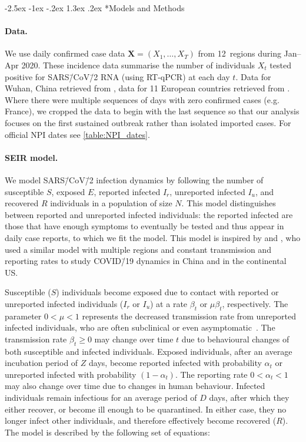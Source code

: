 \documentclass[12pt]{extarticle}
\makeatletter
\renewcommand\section{\@startsection {section}{1}{\z@}%
     {-2.5ex \@plus -1ex \@minus -.2ex}%
     {1.3ex \@plus.2ex}%
    {\Large\bfseries}}
\newcommand{\covid}{COVID\=/19 }
\newcommand{\sars}{SARS\=/CoV\=/2 }
\let\vec\mathbf
\makeatother
\begin{document}
{\small
\section*{Models and Methods}



\paragraph*{Data.} 
We use daily confirmed case data $\vec{X}=(X_1, \ldots, X_T)$ from 12~regions during Jan--Apr 2020. These incidence data summarise the number of individuals $X_t$ tested positive for \sars RNA (using RT-qPCR) at each day $t$.
Data for Wuhan, China retrieved from \citet{Pei2020}, data for 11 European countries retrieved from \citet{Flaxman2020}. 
Where there were multiple sequences of days with zero confirmed cases (e.g. France), we cropped the data to begin with the last sequence so that our analysis focuses on the first sustained outbreak rather than isolated imported cases. 
For official NPI dates see \autoref{table:NPI_dates}.



\paragraph*{SEIR model.} \label{sec:model}
We model SARS\=/CoV\=/2 infection dynamics by following the number of susceptible $S$, exposed $E$, reported infected $I_r$, unreported infected $I_u$, and recovered $R$ individuals in a population of size $N$.
This model distinguishes between reported and unreported infected individuals: the reported infected are those that have enough symptoms to eventually be tested and thus appear in daily case reports, to which we fit the model.
This model is inspired by \citet{Li2020} and \citet{Pei2020}, who used a similar model with multiple regions and constant transmission and reporting rates to study \covid dynamics in China and in the continental US.

Susceptible ($S$) individuals become exposed due to contact with reported or unreported infected individuals ($I_r$ or $I_u$) at a rate $\beta_t$ or $\mu \beta_t$, respectively.
The parameter $0 < \mu < 1$ represents the decreased transmission rate from unreported infected individuals, who are often subclinical or even asymptomatic~\citep{Ferretti2020,Thompson2020}.
The transmission rate $\beta_t \ge 0$ may change over  time $t$ due to behavioural changes of both susceptible and infected individuals.
Exposed individuals, after an average incubation period of $Z$ days, become reported infected with probability $\alpha_t$ or unreported infected with probability $(1-\alpha_t)$.
The reporting rate $0 < \alpha_t < 1$ may also change over time due to changes in human behaviour.
Infected individuals remain infectious for an average period of $D$ days, after which they either recover, or become ill enough to be quarantined.
In either case, they no longer infect other individuals, and therefore effectively become recovered ($R$).
The model is described by the following set of equations:

}
\end{document}
